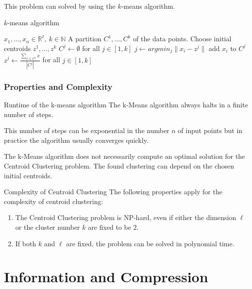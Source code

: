 \documentclass{panikzettel}
\begin{document}
This problem can solved by using the $k$-means algorithm.

\begin{algo}{$k$-means algorithm}
{
\renewcommand{\algorithmicrequire}{\textbf{Input:}}
\renewcommand{\algorithmicensure}{\textbf{Output:}}
  \begin{algorithmic}[1]
  \Require $x_1,...,x_n\in\mathbb{R}^\ell, \ k\in\mathbb{N}$
  \Ensure A partition $C^1, ..., C^k$ of the data points.
  \State Choose initial centroids $z^1,...,z^k$ 
  \Repeat
  \State $C^j \leftarrow \emptyset$ for all $j\in [1,k]$
  	\State $j\leftarrow argmin_j \parallel x_i - z^j \parallel$ 
  	\State add $x_i$ to $C^j$
  \EndFor
  $z^j\leftarrow \frac{\sum_{x\in C^j}x}{|C^j|}$ for all $j\in [1,k]$
  \end{algorithmic}
}
\end{algo}

\subsubsection{Properties and Complexity}
\begin{theo}{Runtime of the k-means algorithm}
The k-Means algorithm always halts in a finite number of steps.
\end{theo}
This number of steps can be exponential in the number $n$ of input points but in practice the algorithm usually converges quickly.

The k-Means algorithm does not necessarily compute an optimal solution for the Centroid Clustering problem. The found clustering can depend on the chosen initial centroids.

\begin{theo}{Complexity of Centroid Clustering}
The following properties apply for the complexity of centroid clustering:
\begin{enumerate}
\item The Centroid Clustering problem is NP-hard, even if either the dimension $\ell$ or the cluster number $k$ are fixed to be $2$.
\item If both $k$ and $\ell$ are fixed, the problem can be solved in polynomial time.
\end{enumerate}
\end{theo}

\section{Information and Compression}
\end{document}
